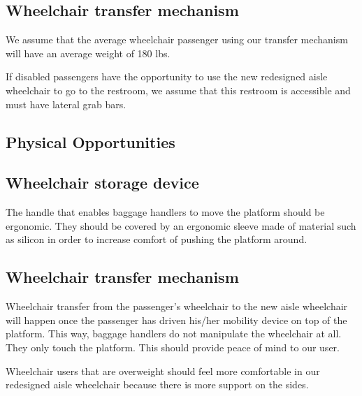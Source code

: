 \subsection*{Wheelchair transfer mechanism}

\begin{list}{-}{}
  \item We assume that the average wheelchair passenger using our transfer mechanism will have an average weight of 180 lbs.
  \item If disabled passengers have the opportunity to use the new redesigned aisle wheelchair to go to the restroom, we assume that this restroom is accessible and must have lateral grab bars.
\end{list}

\newpage

\subsection{Physical Opportunities}

\subsection*{Wheelchair storage device}

\begin{list}{-}{}
  \item The handle that enables baggage handlers to move the platform should be ergonomic. They should be covered by an ergonomic sleeve made of material such as silicon in order to increase comfort of pushing the platform around.
\end{list}

\subsection*{Wheelchair transfer mechanism}

\begin{list}{-}{}
  \item Wheelchair transfer from the passenger's wheelchair to the new aisle wheelchair will happen once the passenger has driven his/her mobility device on top of the platform. This way, baggage handlers do not manipulate the wheelchair at all. They only touch the platform. This should provide peace of mind to our user.
  \item Wheelchair users that are overweight should feel more comfortable in our redesigned aisle wheelchair because there is more support on the sides.
\end{list}


